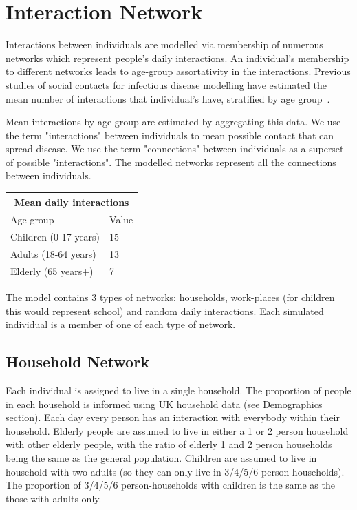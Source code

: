 \documentclass[11pt, oneside]{amsart}   	%
\begin{document}
\section{Interaction Network}

Interactions between individuals are modelled via membership of numerous networks which represent people's daily interactions.
An individual's membership to different networks leads to age-group assortativity in the interactions.
Previous studies of social contacts for infectious disease modelling have estimated the mean number of interactions that individual's have, stratified by age group~\citep{mossong2008social}.

Mean interactions by age-group are estimated by aggregating this data.  We use the term "interactions" between individuals to mean possible contact that can spread disease.  We use the term "connections" between individuals as a superset of possible "interactions".  The modelled networks represent all the connections between individuals.  

\medskip \medskip
\begin{table}[!htbp]
\centering
\begin{tabular}{ |p{5cm}|p{1.5cm}|  }
 \hline
 \multicolumn{2}{|c|}{Mean daily interactions} \\
 \hline
Age group  & Value \\
 \hline
 \hline 
Children (0-17 years) & 15 \\
Adults (18-64 years) & 13 \\
Elderly (65 years+) & 7 \\
 \hline
\end{tabular}
\end{table}
\medskip \medskip

The model contains 3 types of networks: households, work-places (for children this would represent school) and random daily interactions.  Each simulated individual is a member of one of each type of network.  

\subsection{Household Network}
Each individual is assigned to live in a single household.  The proportion of people in each household is informed using UK household data (see Demographics section).
Each day every person has an interaction with everybody within their household.
Elderly people are assumed to live in either a 1 or 2 person household with other elderly people, with the ratio of elderly 1 and 2 person households being the same as the general population.
Children are assumed to live in household with two adults (so they can only live in 3/4/5/6 person households). 
The proportion of 3/4/5/6 person-households with children is the same as the those with adults only.
\end{document}
